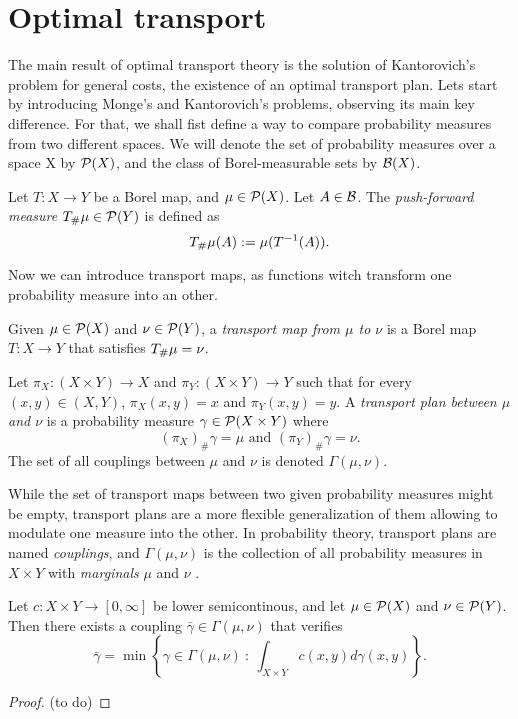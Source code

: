 \section{Optimal transport}
The main result of optimal transport theory is the solution of Kantorovich's problem for general costs, the existence of an optimal transport plan. Lets start by introducing Monge's and Kantorovich's problems, observing its main key difference. For that, we shall fist define a way to compare probability measures from two different spaces. We will denote the set of probability measures over a space X by $ \mathcal P(X) $, and the class of Borel-measurable sets by $ \mathcal B(X) $.

\begin{definition}
    Let $ T: X \to Y $ be a Borel map, and $ \mu \in \mathcal P(X)$. Let $ A \in \mathcal B $. The {\it push-forward measure} $ T_\#\mu \in \mathcal P(Y) $ is defined as
    $$
        T_\#\mu(A) := \mu (T^{-1}(A)).
    $$
\end{definition}

Now we can introduce transport maps, as functions witch transform one probability measure into an other.

\begin{definition}
    Given $ \mu \in \mathcal P(X) $ and $ \nu \in \mathcal P(Y) $, a {\it transport map from $\mu$ to $\nu$} is a Borel map $ T: X \to Y $ that satisfies $ T_\#\mu = \nu$.
\end{definition}


\begin{definition}
    Let $\pi_X : (X \times Y) \to X $ and $\pi_Y : (X \times Y) \to Y$ such that for every $(x, y) \in (X, Y) $, $\pi_X(x, y) = x$ and $ \pi_Y(x, y) = y $. A {\it transport plan between $\mu$ and $\nu$} is a probability measure $ \gamma \in \mathcal P(X \times Y) $ where
    $$
        (\pi_X)_\# \gamma = \mu \text{ and } (\pi_Y)_\# \gamma = \nu.
    $$
    The set of all couplings between $ \mu $ and $\nu$ is denoted $\Gamma(\mu, \nu)$.
\end{definition}

While the set of transport maps between two given probability measures might be empty, transport plans are a more flexible generalization of them allowing to modulate one measure into the other. In probability theory, transport plans are named {\it couplings}, and $\Gamma(\mu, \nu)$ is the collection of all probability measures in $ X \times Y $ with {\it marginals} $ \mu $ and $ \nu $ \cite{class}.


\begin{proposition}
    Let $ c: X \times Y \to [0, \infty] $ be lower semicontinous, and let $ \mu \in \mathcal P(X) $ and $ \nu \in \mathcal P(Y) $. Then there exists a coupling $ \bar \gamma \in \Gamma(\mu, \nu) $ that verifies
    $$
        \bar \gamma = \min \left\{ \gamma \in \Gamma(\mu, \nu) \ : \ \int_{X \times Y} c(x, y) d\gamma(x,y) \right\}.
    $$
\end{proposition}
\begin{proof}
    (to do)
\end{proof}

